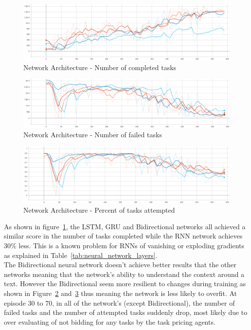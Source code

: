 \begin{figure}[H]
    \centering
    \includegraphics[width=\linewidth]{figures/5_evaluation_figs/net_arch_training_fig/num_completed_tasks.PNG}
    \caption{Network Architecture - Number of completed tasks}
    \label{fig:net_arch_num_completed_tasks}
\end{figure}

\begin{figure}[H]
    \centering
    \includegraphics[width=\linewidth]{figures/5_evaluation_figs/net_arch_training_fig/num_failed_tasks.png}
    \caption{Network Architecture - Number of failed tasks}
    \label{fig:net_arch_num_failed_tasks}
\end{figure}

\begin{figure}[H]
    \centering
    \includegraphics[width=\linewidth]{figures/5_evaluation_figs/net_arch_training_fig/percent_tasks.png}
    \caption{Network Architecture - Percent of tasks attempted}
    \label{fig:net_arch_percent_tasks}
\end{figure}

As shown in figure~\ref{fig:net_arch_num_completed_tasks}, the LSTM, GRU and Bidirectional networks all achieved a
similar score in the number of tasks completed while the RNN network achieves 30\% less. This is a known problem for
RNNs of vanishing or exploding gradients as explained in Table~\ref{tab:neural_network_layers}. \\
The Bidirectional neural network doesn't achieve better results that the other networks meaning that the network's
ability to understand the context around a text. However the Bidirectional seem more resilient to changes during
training as shown in Figure~\ref{fig:net_arch_num_failed_tasks} and~\ref{fig:net_arch_percent_tasks} thus meaning the
network is less likely to overfit. At episode 30 to 70, in all of the network's (except Bidirectional), the number of
failed tasks and the number of attempted tasks suddenly drop, most likely due to over evaluating of not bidding for any
tasks by the task pricing agents.
